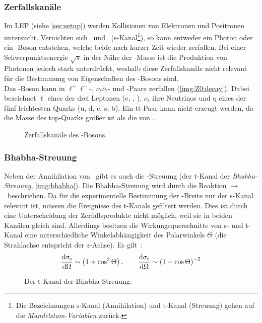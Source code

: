 \subsubsection*{Zerfallskanäle}
Im LEP (siehe \autoref{sec:setup}) werden Kollisionen von Elektronen und Positronen untersucht.
Vernichten sich \elp\ und \elm\ (s-Kanal\footnote{Die Bezeichnungen s-Kanal (Annihilation) und t-Kanal (Streuung) gehen auf die
\emph{Mandelstam-Variablen} zurück.}), so kann entweder ein Photon oder ein \Z-Boson entstehen, welche beide nach kurzer Zeit wieder
zerfallen. Bei einer Schwerpunktsenergie $\sqrt{s}$ in der Nähe der \Z-Masse ist die Produktion von Photonen jedoch stark unterdrückt,
weshalb diese Zerfallskanäle nicht relevant für die Bestimmung von Eigenschaften des \Z-Bosons sind. \\
Das \Z-Boson kann in $\ell^+\ell^-$-, $\nu_\ell\bar{\nu}_\ell$- und \qq-Paare zerfallen (\autoref{img:Z0:decay}).
Dabei bezeichnet $\ell$ eines der drei Leptonen (e, \textmu, \texttau), $\nu_\ell$ ihre Neutrinos und q eines der fünf leichtesten Quarks 
(u, d, c, s, b). Ein t$\bar{\text{t}}$-Paar
kann nicht erzeugt werden, da die Masse des top-Quarks größer ist als die von \Z.
\begin{figure}[H]
    \centering
    \def\svgwidth{0.7\textwidth}
    
    \caption{Zerfallskanäle des \Z-Bosons.}
    \label{img:Z0:decay}
\end{figure}
\subsubsection*{Bhabha-Streuung}
\label{subsub:theo:stchannel}
Neben der Annihilation von \ee\ gibt es auch die \ee-Streuung
(der t-Kanal der \emph{Bha\-bha-Streu\-ung}, \autoref{img:bhabha}).
Die Bhabha-Streuung wird durch die Reaktion \ee$\to$\ee\ beschrieben.
Da für die experimentelle Bestimmung der \Z-Breite nur der s-Kanal relevant ist, müssen die Ereignisse des t-Kanals gefiltert werden.
Dies ist durch eine Unterscheidung der Zerfallsprodukte nicht möglich, weil sie in beiden Kanälen gleich sind. Allerdings besitzen
die Wirkungsquerschnitte von s- und t-Kanal eine unterschiedliche Winkelabhängigkeit des Polarwinkels $\Theta$
(die Strahlachse entspricht der $z$-Achse). Es gilt~\cite{manual}:
\begin{equation}
    \label{eq:stchannel:sigmas}
    \frac{\mathrm{d} \sigma_\text{s}}{\mathrm{d} \Omega} \sim \left( 1 + \cos^2 \Theta \right), \qquad
    \frac{\mathrm{d} \sigma_\text{t}}{\mathrm{d} \Omega} \sim \left( 1 - \cos \Theta \right)^{-2}
\end{equation}
\begin{figure}[H]
    \centering
    \def\svgwidth{0.5\textwidth}
    
    \caption{Der t-Kanal der Bhabha-Streuung.}
    \label{img:bhabha}
\end{figure}

